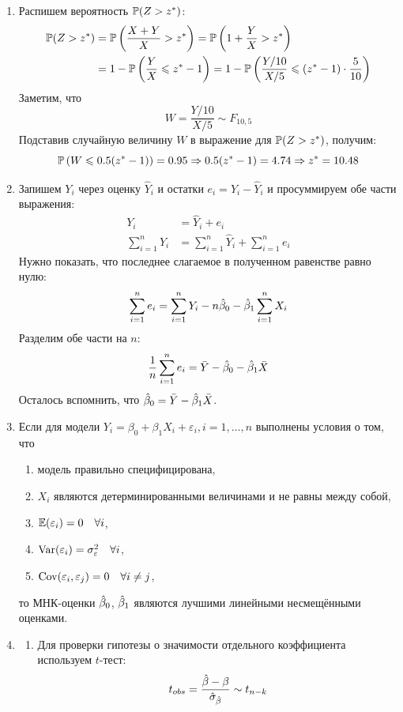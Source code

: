 \begin{enumerate}
\item Распишем вероятность $\P(Z >z^*)$:
\begin{align*}
\P(Z >z^*) &= \P \left(\frac{X+Y}{X} > z^* \right) = \P \left(1 + \frac{Y}{X} > z^* \right) \\
&= 1 - \P\left(\frac{Y}{X} \leq z^* - 1 \right) = 1 - \P\left(\frac{Y/10}{X/5} \leq \left(z^* - 1\right) \cdot \frac{5}{10} \right)
\end{align*}
Заметим, что
\[
W = \frac{Y/10}{X/5} \sim F_{10,5}
\]
Подставив случайную величину $W$ в выражение для $\P(Z >z^*)$, получим:
\[
\P\left(W \leq 0.5(z^* - 1) \right) = 0.95 \Rightarrow 0.5(z^* - 1) = 4.74 \Rightarrow z^* = 10.48
\]
\item Запишем $Y_i$ через оценку $\hat Y_i$ и остатки $e_i = Y_i - \hat Y_i$ и
просуммируем обе части выражения:
\begin{align*}
Y_i &= \hat Y_i + e_i \\
\sum_{i=1}^n Y_i &= \sum_{i=1}^n \hat Y_i + \sum_{i=1}^n e_i
\end{align*}
Нужно показать, что последнее слагаемое в полученном равенстве равно нулю:
\[
\sum_{i=1}^n e_i = \sum_{i=1}^n Y_i - n\hb_0 - \hb_1 \sum_{i=1}^n X_i
\]
Разделим обе части на $n$:
\[
\frac{1}{n} \sum_{i=1}^n e_i = \bar Y - \hb_0 - \hb_1 \bar X
\]
Осталось вспомнить, что $\hb_0 = \bar Y - \hb_1 \bar X$.
\item Если для модели $Y_i = \beta_0 + \beta_1 X_i + \varepsilon_i, i=1, \ldots, n$
выполнены условия о том, что
\begin{enumerate}
  \item модель правильно специфицирована,
  \item $X_i$ являются детерминированными величинами и не равны между собой,
  \item $\E(\varepsilon_i) = 0 \quad \forall i$,
  \item $\Var(\varepsilon_i) = \sigma^2_{\varepsilon} \quad \forall i$,
  \item $\Cov(\varepsilon_i, \varepsilon_j) = 0 \quad \forall i \neq j$,
\end{enumerate}
то МНК-оценки $\hb_0$, $\hb_1$ являются лучшими линейными несмещёнными оценками.
\item
\begin{enumerate}
\item Для проверки гипотезы о значимости отдельного коэффициента используем $t$-тест:
\[
t_{obs} = \frac{\hb - \beta}{\hat{\sigma}_{\hb}} \sim t_{n-k}
\]
\begin{itemize}

\end{itemize}
\end{enumerate}
\end{enumerate}

